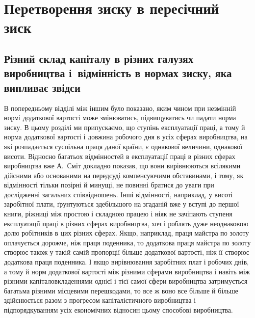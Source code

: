 
\chapter{Перетворення зиску в пересічний зиск}

\section{%
Різний склад капіталу в різних галузях виробництва
і~відмінність в нормах зиску, яка випливає звідси}
%

В попередньому відділі між іншим було показано, яким чином
при незмінній нормі додаткової вартості може змінюватись, підвищуватись
чи падати норма зиску. В цьому розділі ми припускаємо,
що ступінь експлуатації праці, а тому й норма додаткової
вартості і довжина робочого дня в усіх сферах виробництва,
на які розпадається суспільна праця даної країни, є однакової величини,
однакової висоти. Відносно багатьох відмінностей в експлуатації
праці в різних сферах виробництва вже А.~Сміт докладно показав,
що вони вирівнюються всілякими дійсними або основаними на передсуді
компенсуючими обставинами, і тому, як відмінності тільки
позірні й минущі, не повинні братися до уваги при дослідженні загальних
співвідношень. Інші відмінності, наприклад, у висоті заробітної
плати, ґрунтуються здебільшого на згаданій вже у вступі до
першої книги, ріжниці між простою і складною працею
і ніяк не зачіпають ступеня експлуатації праці в різних сферах
виробництва, хоч і роблять дуже неоднаковою долю робітників
в цих різних сферах. Якщо, наприклад, праця майстра по золоту
оплачується дорожче, ніж праця поденника, то додаткова праця
майстра по золоту створює також у такій самій пропорції більше
додаткової вартості, ніж її створює додаткова праця поденника.
І якщо вирівнювання заробітних плат і робочих днів, а тому й
норм додаткової вартості між різними сферами виробництва
і навіть між різними капіталовкладеннями однієї і тієї самої
сфери виробництва затримується багатьма різними місцевими
перешкодами, то все ж воно все більше й більше здійснюється
разом з прогресом капіталістичного виробництва і підпорядкуванням
усіх економічних відносин цьому способові виробництва.
\parbreak{}  %
